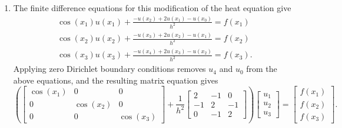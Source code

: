 {\begin{solution}
\begin{enumerate}
\[\begin{array}{ccc}
               -1 & 2 &  -1  \\
                 0 &   -1  & 1 
               \end{array}\right]
               \left[\begin{array}{c}
               1\\1\\1
               \end{array}\right]=
                                  \left[\begin{array}{c}
               4(1 - 1)\\ 4(-1 + 2 -1) \\ 4(1-1)
               \end{array}\right] = 
                                  \left[\begin{array}{c}
0\\0\\0
               \end{array}\right].
\]
This implies that the system matrix has a non-trivial nullspace, so that the solution to the finite difference matrix equation is non-unique.
\item The finite difference equations for this modification of the heat equation give
\begin{eqnarray*}
\cos(x_1) u(x_1) + \frac{-u(x_{2}) + 2u(x_1) - u(x_{0})}{h^2} =  f(x_1)\\
\cos(x_2) u(x_2) +\frac{-u(x_{3}) + 2u(x_2) - u(x_{1})}{h^2} =  f(x_2)\\
\cos(x_3) u(x_3) +\frac{-u(x_{4}) + 2u(x_3) - u(x_{2})}{h^2} =  f(x_3).
\end{eqnarray*}
Applying zero Dirichlet boundary conditions removes $u_4$ and $u_0$ from the above equations, and the resulting matrix equation gives
\[
\left(\left[\begin{array}{ccc}
              \cos(x_1) &0 & 0 \\
               0 & \cos(x_2) &  0  \\
                 0 &   0  & \cos(x_3) 
               \end{array}\right] + \frac{1}{h^2}\left[\begin{array}{ccc}
              2 & -1&0 \\
               -1 & 2 &  -1  \\
                 0 &   -1  & 2 
               \end{array}\right]\right)
               \left[\begin{array}{c}
               u_1\\u_2\\u_3
               \end{array}\right] = 
                              \left[\begin{array}{c}
               f(x_1)\\f(x_2)\\f(x_3) 
               \end{array}\right].
\]

\end{enumerate}
\end{solution}
}{}
